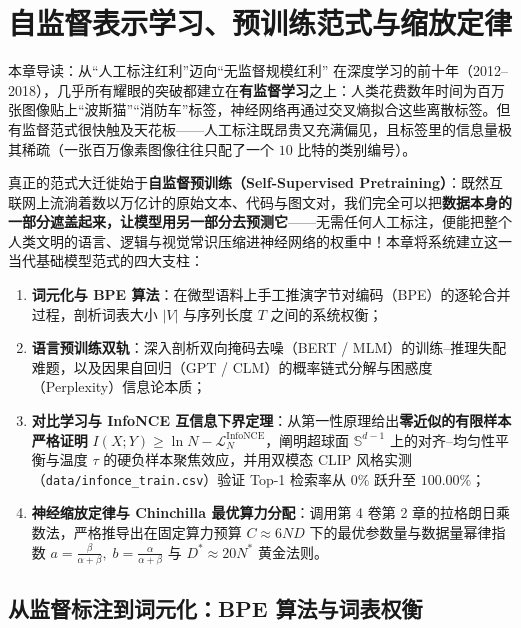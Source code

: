 \chapter[自监督预训练、对比学习与缩放律]{自监督表示学习、预训练范式与缩放定律}
\label{ch:pretrain-scaling}


\begin{chapIntro}{本章导读：从“人工标注红利”迈向“无监督规模红利”}
在深度学习的前十年（2012--2018），几乎所有耀眼的突破都建立在\textbf{有监督学习}之上：人类花费数年时间为百万张图像贴上“波斯猫”“消防车”标签，神经网络再通过交叉熵拟合这些离散标签。但有监督范式很快触及天花板——人工标注既昂贵又充满偏见，且标签里的信息量极其稀疏（一张百万像素图像往往只配了一个 $10$ 比特的类别编号）。

真正的范式大迁徙始于\textbf{自监督预训练（Self-Supervised Pretraining）}：既然互联网上流淌着数以万亿计的原始文本、代码与图文对，我们完全可以把\textbf{数据本身的一部分遮盖起来，让模型用另一部分去预测它}——无需任何人工标注，便能把整个人类文明的语言、逻辑与视觉常识压缩进神经网络的权重中！本章将系统建立这一当代基础模型范式的四大支柱：
\begin{enumerate}
  \item \textbf{词元化与 BPE 算法}：在微型语料上手工推演字节对编码（BPE）的逐轮合并过程，剖析词表大小 $|V|$ 与序列长度 $T$ 之间的系统权衡；
  \item \textbf{语言预训练双轨}：深入剖析双向掩码去噪（BERT / MLM）的训练--推理失配难题，以及因果自回归（GPT / CLM）的概率链式分解与困惑度（Perplexity）信息论本质；
  \item \textbf{对比学习与 InfoNCE 互信息下界定理}：从第一性原理给出\textbf{零近似的有限样本严格证明} $I(X; Y) \ge \ln N - \mathcal{L}_N^{\mathrm{InfoNCE}}$，阐明超球面 $\mathbb{S}^{d-1}$ 上的对齐--均匀性平衡与温度 $\tau$ 的硬负样本聚焦效应，并用双模态 CLIP 风格实测（\texttt{data/infonce\_train.csv}）验证 Top-1 检索率从 $0\%$ 跃升至 $100.00\%$；
  \item \textbf{神经缩放定律与 Chinchilla 最优算力分配}：调用第 4 卷第 2 章的拉格朗日乘数法，严格推导出在固定算力预算 $C \approx 6ND$ 下的最优参数量与数据量幂律指数 $a = \frac{\beta}{\alpha+\beta},\; b = \frac{\alpha}{\alpha+\beta}$ 与 $D^* \approx 20 N^*$ 黄金法则。
\end{enumerate}
\end{chapIntro}

\section{从监督标注到词元化：BPE 算法与词表权衡}
\label{sec:bpe}

